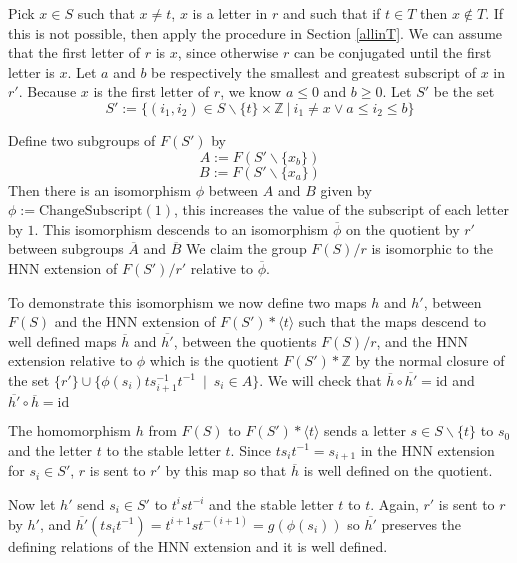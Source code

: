 \documentclass[12pt]{article} %
\theoremstyle{definition}
\theoremstyle{definition}
\theoremstyle{definition}
\theoremstyle{definition}
\theoremstyle{definition}
\theoremstyle{definition}
\begin{document}
Pick $x \in S$ such that $x \ne t$,
  $x$ is a letter in $r$ and such that if $t \in T$ then $x \notin T$.
  If this is not possible, then apply the procedure in Section \ref{allinT}.
We can assume that the first letter of $r$ is
$x$, since otherwise $r$ can be conjugated until the first letter is $x$.
Let $a$ and $b$ be respectively the
smallest and greatest subscript of $x$ in $r'$. Because $x$ is the first
letter of $r$, we know $a \le 0$ and $b \ge 0$. Let $S'$ be the set
\begin{equation}
S' := \{(i_1, i_2) \in S \backslash \{t\} \times \mathbb{Z} \
| \ i_1 \ne x \vee a \le i_2 \le b \}
\end{equation}

Define two subgroups of $F(S')$ by
\begin{equation}
  A := F(S' \backslash \{x_b\})
\end{equation}
\begin{equation}
  B := F(S' \backslash \{x_a\})
\end{equation}
Then there is an isomorphism $\phi$ between $A$ and $B$ given by
$\phi := \text{ChangeSubscript}(1)$, this
increases the value of the subscript of each letter by $1$.
This isomorphism descends to an isomorphism
$\overline{\phi}$ on the quotient by $r'$ between subgroups $\overline{A}$ and $\overline{B}$
We claim the group $F(S) / r$ is isomorphic to the HNN extension of
$F(S') / r'$ relative to $\overline{\phi}$.

To demonstrate this isomorphism we now define two maps $h$ and $h'$,
between $F(S)$ and the HNN extension of $F(S') \ast \langle t \rangle$ such that
the maps descend to well defined maps $\overline{h}$ and $\overline{h'}$, between the quotients
$F(S) / r$, and the HNN extension relative to $\phi$ which is the
quotient $F(S') \ast \mathbb{Z}$ by the normal closure of the set
$\{r'\} \cup \{\phi(s_i)ts_{i+1}^{-1}t^{-1} \ \mid \ s_i \in A\}$.
We will check that $\overline{h} \circ \overline{h'} = \text{id}$ and
$\overline{h'} \circ \overline{h} = \text{id}$

The homomorphism $h$ from $F(S)$ to $F(S') \ast \langle t \rangle$ sends a letter
$s \in S \backslash \{t\}$ to $s_0$ and
the letter $t$ to the stable letter $t$.
Since $t s_i t^{-1} = s_{i+1}$ in
the HNN extension for $s_i \in S'$,
$r$ is sent to $r'$ by this map so that $\overline{h}$ is well defined
on the quotient.

Now let $h'$ send $s_i \in S'$ to $t^{i} s t^{-i}$ and the stable letter $t$ to $t$.
Again, $r'$ is sent to $r$ by $h'$, and $\overline{h'} (t s_i t^{-1}) = t^{i+1} s t^{-(i+1)} =
g (\phi (s_i))$ so $\overline{h'}$ preserves the defining relations of the HNN extension and it
is well defined.
\end{document}
